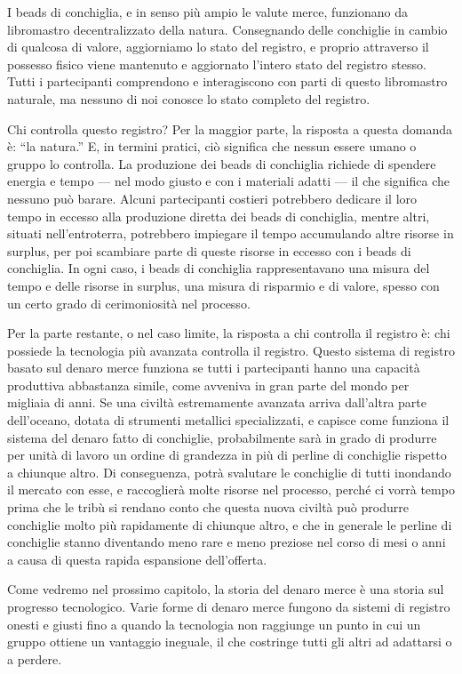 \documentclass[
  a5paper,
  smalldemyvopaper,10pt,twoside,onecolumn,openright,extrafontsizes,hidelinks]{memoir}
\begin{document}
I beads di conchiglia, e in senso più ampio le valute merce, funzionano
da libromastro decentralizzato della natura. Consegnando delle
conchiglie in cambio di qualcosa di valore, aggiorniamo lo stato del
registro, e proprio attraverso il possesso fisico viene mantenuto e
aggiornato l'intero stato del registro stesso. Tutti i partecipanti
comprendono e interagiscono con parti di questo libromastro naturale, ma
nessuno di noi conosce lo stato completo del registro.

Chi controlla questo registro? Per la maggior parte, la risposta a
questa domanda è: ``la natura.'' E, in termini pratici, ciò significa
che nessun essere umano o gruppo lo controlla. La produzione dei beads
di conchiglia richiede di spendere energia e tempo --- nel modo giusto e
con i materiali adatti --- il che significa che nessuno può barare.
Alcuni partecipanti costieri potrebbero dedicare il loro tempo in
eccesso alla produzione diretta dei beads di conchiglia, mentre altri,
situati nell'entroterra, potrebbero impiegare il tempo accumulando altre
risorse in surplus, per poi scambiare parte di queste risorse in eccesso
con i beads di conchiglia. In ogni caso, i beads di conchiglia
rappresentavano una misura del tempo e delle risorse in surplus, una
misura di risparmio e di valore, spesso con un certo grado di
cerimoniosità nel processo.

Per la parte restante, o nel caso limite, la risposta a chi controlla il
registro è: chi possiede la tecnologia più avanzata controlla il
registro. Questo sistema di registro basato sul denaro merce funziona se
tutti i partecipanti hanno una capacità produttiva abbastanza simile,
come avveniva in gran parte del mondo per migliaia di anni. Se una
civiltà estremamente avanzata arriva dall'altra parte dell'oceano,
dotata di strumenti metallici specializzati, e capisce come funziona il
sistema del denaro fatto di conchiglie, probabilmente sarà in grado di
produrre per unità di lavoro un ordine di grandezza in più di perline di
conchiglie rispetto a chiunque altro. Di conseguenza, potrà svalutare le
conchiglie di tutti inondando il mercato con esse, e raccoglierà molte
risorse nel processo, perché ci vorrà tempo prima che le tribù si
rendano conto che questa nuova civiltà può produrre conchiglie molto più
rapidamente di chiunque altro, e che in generale le perline di
conchiglie stanno diventando meno rare e meno preziose nel corso di mesi
o anni a causa di questa rapida espansione dell'offerta.

Come vedremo nel prossimo capitolo, la storia del denaro merce è una
storia sul progresso tecnologico. Varie forme di denaro merce fungono da
sistemi di registro onesti e giusti fino a quando la tecnologia non
raggiunge un punto in cui un gruppo ottiene un vantaggio ineguale, il
che costringe tutti gli altri ad adattarsi o a perdere.
\end{document}
